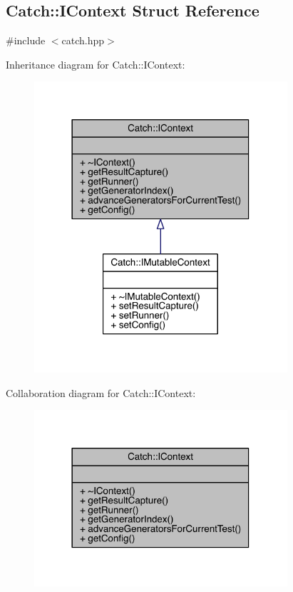 \hypertarget{a00031}{}\subsection{Catch\+:\+:I\+Context Struct Reference}
\label{a00031}


{\ttfamily \#include $<$catch.\+hpp$>$}



Inheritance diagram for Catch\+:\+:I\+Context\+:\nopagebreak
\begin{figure}[H]
\begin{center}
\leavevmode
\includegraphics[width=266pt]{a00193}
\end{center}
\end{figure}


Collaboration diagram for Catch\+:\+:I\+Context\+:\nopagebreak
\begin{figure}[H]
\begin{center}
\leavevmode
\includegraphics[width=266pt]{a00194}
\end{center}
\end{figure}
